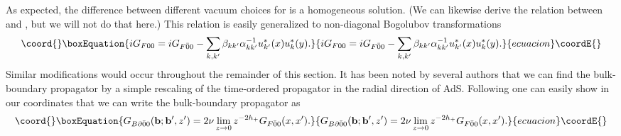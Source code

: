 \documentclass[a4paper,aps,prd,preprintnumbers,groupedaddress]{revtex4}
\begin{document}
As expected, the difference between different vacuum choices for \coordHE{} is a homogeneous solution.  (We can likewise derive the relation between \coordHE{} and \coordHE{}, but we will not do that here.)    This relation is easily generalized to non-diagonal Bogolubov
transformations
\begin{equation}\coord{}\boxEquation{
iG_{F00}= iG_{F\bar{0}{0}} - \sum_{k,k'} \beta_{kk'}\alpha^{-1}_{kk'} u_{k'}^*(x)u_k^*(y) .
}{
iG_{F00}= iG_{F\bar{0}{0}} - \sum_{k,k'} \beta_{kk'}\alpha^{-1}_{kk'} u_{k'}^*(x)u_k^*(y) .
}{ecuacion}\coordE{}\end{equation}
Similar modifications would occur throughout the remainder of this section.
It has been noted by several authors \cite{banks98,vijay99,giddings99} that we can find the bulk-boundary propagator by a simple rescaling
of the time-ordered propagator in the radial direction of AdS.
Following \cite{giddings99} one can easily show in our coordinates that we can write the
bulk-boundary propagator as
\begin{equation}\coord{}\boxEquation{
G_{B\partial \bar{0} 0} ({\bf b}; {\bf b'}, z') = 2 \nu \lim_{z \rightarrow 0} z^{-2h_+} G_{F \bar{0} 0} (x,x') .
}{
G_{B\partial \bar{0} 0} ({\bf b}; {\bf b'}, z') = 2 \nu \lim_{z \rightarrow 0} z^{-2h_+} G_{F \bar{0} 0} (x,x') .
}{ecuacion}\coordE{}\end{equation}
\end{document}
